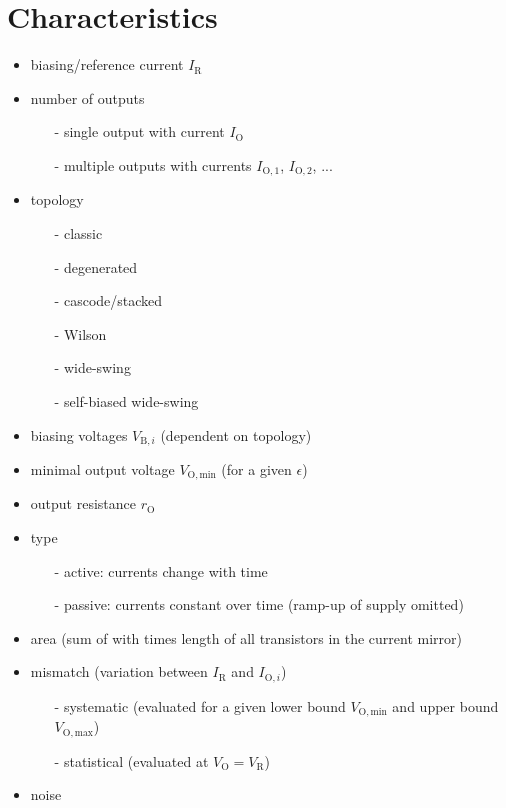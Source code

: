 \documentclass{article}[11pt]
\begin{document}
\notetitle

\section{Characteristics}

\begin{itemize}
  \item biasing/reference current $I_{\mathrm{R}}$
  
  \item number of outputs
    \begin{itemize}
      \item[-] single output with current $I_{\mathrm{O}}$
      \item[-] multiple outputs with currents $I_{\mathrm{O,1}}$, $I_{\mathrm{O,2}}$, ...
    \end{itemize}

  \item topology
    \begin{itemize}
      \item[-] classic
      \item[-] degenerated
      \item[-] cascode/stacked 
      \item[-] Wilson 
      \item[-] wide-swing
      \item[-] self-biased wide-swing
    \end{itemize}

  \item  biasing voltages $V_{\mathrm{B,}i}$ (dependent on topology)

  \item minimal output voltage $V_{\mathrm{O,min}}$ (for a given $\epsilon$)

  \item output resistance $r_{\mathrm{O}}$

  \item type
    \begin{itemize}
      \item[-] active: currents change with time
      \item[-] passive: currents constant over time (ramp-up of supply omitted)  
    \end{itemize}

  \item area (sum of with times length of all transistors in the current mirror)

  \item mismatch (variation between $I_{\mathrm{R}}$ and $I_{\mathrm{O,}i}$)
    \begin{itemize}
      \item[-] systematic 
        (evaluated for a given lower bound 
          $V_{\mathrm{O,min}}$ and upper bound $V_{\mathrm{O,max}}$)
      \item[-] statistical (evaluated at $V_{\mathrm{O}}=V_{\mathrm{R}}$)
    \end{itemize}
  \item noise
\end{itemize}
\end{document}
